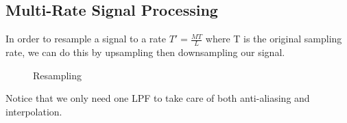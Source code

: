 \subsection{Multi-Rate Signal Processing}
In order to resample a signal to a rate $T'=\frac{MT}{L}$ where T is the original sampling rate, we can do this by upsampling then downsampling our signal.
\begin{gitbook-image}
\begin{figure}[!h]
  \centering
  \caption{Resampling}
  \label{Resampling}
\end{figure}
\end{gitbook-image}
Notice that we only need one LPF to take care of both anti-aliasing and interpolation.
